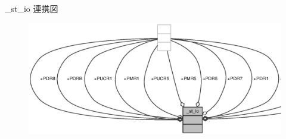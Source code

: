\+\_\+st\+\_\+io 連携図
\nopagebreak
\begin{figure}[H]
\begin{center}
\leavevmode
\includegraphics[width=350pt]{d5/de4/struct__st__io__coll__graph}
\end{center}
\end{figure}
